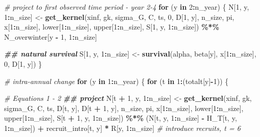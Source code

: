 \documentclass[
]{article}
\newenvironment{Shaded}{\begin{snugshade}}{\end{snugshade}}
\newcommand{\CommentTok}[1]{\textcolor[rgb]{0.56,0.35,0.01}{\textit{#1}}}
\newcommand{\ControlFlowTok}[1]{\textcolor[rgb]{0.13,0.29,0.53}{\textbf{#1}}}
\newcommand{\DecValTok}[1]{\textcolor[rgb]{0.00,0.00,0.81}{#1}}
\newcommand{\DocumentationTok}[1]{\textcolor[rgb]{0.56,0.35,0.01}{\textbf{\textit{#1}}}}
\newcommand{\FunctionTok}[1]{\textcolor[rgb]{0.13,0.29,0.53}{\textbf{#1}}}
\newcommand{\NormalTok}[1]{#1}
\newcommand{\OtherTok}[1]{\textcolor[rgb]{0.56,0.35,0.01}{#1}}
\newcommand{\SpecialCharTok}[1]{\textcolor[rgb]{0.81,0.36,0.00}{\textbf{#1}}}
\begin{document}
\begin{Shaded}
\begin{Highlighting}[]
  \CommentTok{\# project to first observed time period {-} year 2{-}4}
  \ControlFlowTok{for}\NormalTok{ (y }\ControlFlowTok{in} \DecValTok{2}\SpecialCharTok{:}\NormalTok{n\_year) \{}
\NormalTok{    N[}\DecValTok{1}\NormalTok{, y, }\DecValTok{1}\SpecialCharTok{:}\NormalTok{n\_size] }\OtherTok{\textless{}{-}} \FunctionTok{get\_kernel}\NormalTok{(xinf, gk, sigma\_G, C,}
\NormalTok{                                    ts, }\DecValTok{0}\NormalTok{, D[}\DecValTok{1}\NormalTok{, y], n\_size, pi,}
\NormalTok{                                    x[}\DecValTok{1}\SpecialCharTok{:}\NormalTok{n\_size], lower[}\DecValTok{1}\SpecialCharTok{:}\NormalTok{n\_size],}
\NormalTok{                                    upper[}\DecValTok{1}\SpecialCharTok{:}\NormalTok{n\_size], S[}\DecValTok{1}\NormalTok{, y, }\DecValTok{1}\SpecialCharTok{:}\NormalTok{n\_size]) }\SpecialCharTok{\%*\%}
\NormalTok{      N\_overwinter[y }\SpecialCharTok{{-}} \DecValTok{1}\NormalTok{, }\DecValTok{1}\SpecialCharTok{:}\NormalTok{n\_size]}
    
    \DocumentationTok{\#\# natural survival}
\NormalTok{    S[}\DecValTok{1}\NormalTok{, y, }\DecValTok{1}\SpecialCharTok{:}\NormalTok{n\_size] }\OtherTok{\textless{}{-}} \FunctionTok{survival}\NormalTok{(alpha, beta[y], x[}\DecValTok{1}\SpecialCharTok{:}\NormalTok{n\_size], }\DecValTok{0}\NormalTok{, D[}\DecValTok{1}\NormalTok{, y])}
\NormalTok{  \}}
  
  \CommentTok{\# intra{-}annual change}
  \ControlFlowTok{for}\NormalTok{ (y }\ControlFlowTok{in} \DecValTok{1}\SpecialCharTok{:}\NormalTok{n\_year) \{}
    \ControlFlowTok{for}\NormalTok{ (t }\ControlFlowTok{in} \DecValTok{1}\SpecialCharTok{:}\NormalTok{(totalt[y]}\SpecialCharTok{{-}}\DecValTok{1}\NormalTok{)) \{}

      \CommentTok{\# Equations 1 {-} 2}
      \DocumentationTok{\#\# project}
\NormalTok{      N[t }\SpecialCharTok{+} \DecValTok{1}\NormalTok{, y, }\DecValTok{1}\SpecialCharTok{:}\NormalTok{n\_size] }\OtherTok{\textless{}{-}} \FunctionTok{get\_kernel}\NormalTok{(xinf, gk, sigma\_G,}
\NormalTok{                                          C, ts, D[t, y],}
\NormalTok{                                          D[t }\SpecialCharTok{+} \DecValTok{1}\NormalTok{, y], n\_size, pi,}
\NormalTok{                                          x[}\DecValTok{1}\SpecialCharTok{:}\NormalTok{n\_size], lower[}\DecValTok{1}\SpecialCharTok{:}\NormalTok{n\_size],}
\NormalTok{                                          upper[}\DecValTok{1}\SpecialCharTok{:}\NormalTok{n\_size],}
\NormalTok{                                          S[t }\SpecialCharTok{+} \DecValTok{1}\NormalTok{, y, }\DecValTok{1}\SpecialCharTok{:}\NormalTok{n\_size])  }\SpecialCharTok{\%*\%}
\NormalTok{        (N[t, y, }\DecValTok{1}\SpecialCharTok{:}\NormalTok{n\_size] }\SpecialCharTok{{-}}\NormalTok{ H\_T[t, y, }\DecValTok{1}\SpecialCharTok{:}\NormalTok{n\_size]) }\SpecialCharTok{+}
\NormalTok{        recruit\_intro[t, y] }\SpecialCharTok{*}\NormalTok{ R[y, }\DecValTok{1}\SpecialCharTok{:}\NormalTok{n\_size] }\CommentTok{\# introduce recruits, t = 6}


\end{Highlighting}
\end{Shaded}
\end{document}
